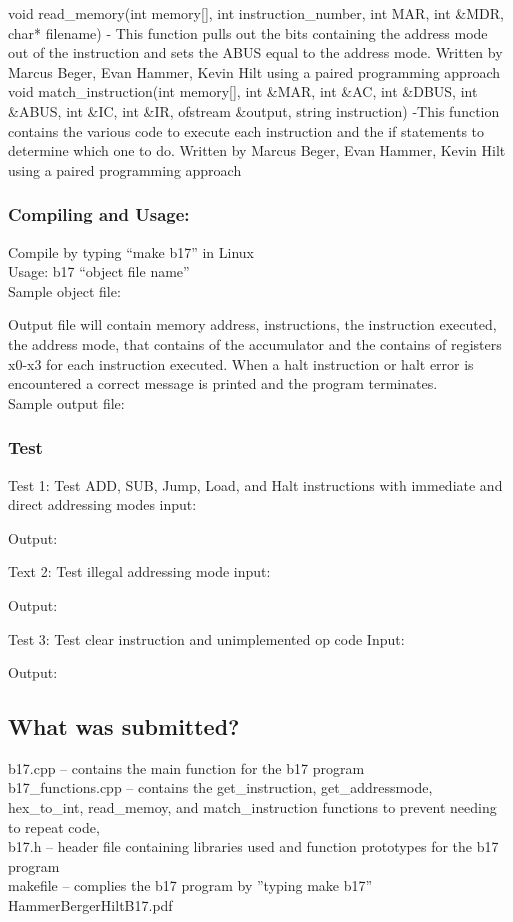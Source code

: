 \documentclass[11pt]{article}
\begin{document}
void read\_memory(int memory[], int instruction\_number, int MAR,  int \&MDR, char* filename) - This function pulls out the bits containing the address mode out of the  instruction and sets the ABUS equal to the address mode. Written by Marcus Beger, Evan Hammer, Kevin Hilt using a paired programming approach\\

void match\_instruction(int memory[], int \&MAR, int \&AC, int \&DBUS, int \&ABUS,
					   int \&IC, int \&IR, ofstream \&output, string instruction) -This function contains the various code to execute each instruction and the if statements to determine which one to do. Written by Marcus Beger, Evan Hammer, Kevin Hilt using a paired programming approach\\

\subsubsection{Compiling and Usage:}
Compile by typing “make b17” in Linux\\
Usage: b17 “object file name”\\
Sample object file:

Output file will contain memory address, instructions, the instruction executed, the address mode, that contains of the accumulator and the contains of registers x0-x3 for each instruction executed. When a halt instruction or halt error is encountered a correct message is printed and the program terminates. \\
Sample output file:


\subsubsection{Test}
Test 1: Test  ADD, SUB, Jump, Load, and Halt instructions with immediate and direct addressing modes
input:

Output:

Text 2: Test illegal addressing mode
input:

Output:

Test 3: Test clear instruction and unimplemented op code
Input:

Output:


\subsection{What was submitted?}
b17.cpp – contains the main function for the b17 program\\
b17\_functions.cpp – contains the get\_instruction, get\_addressmode, hex\_to\_int, read\_memoy, and match\_instruction functions to prevent needing to repeat code,\\
b17.h – header file containing libraries used and function prototypes for the b17 program\\
makefile – complies the b17 program by ''typing make b17''\\
HammerBergerHiltB17.pdf
\end{document}
